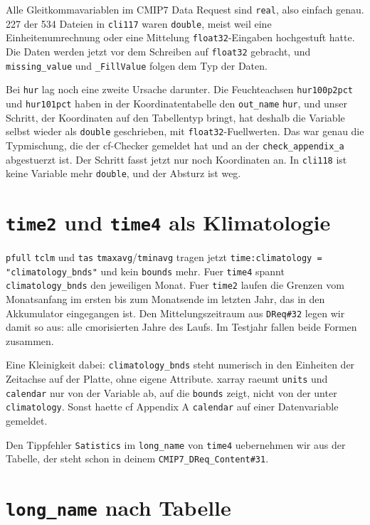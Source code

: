 \documentclass[11pt,a4paper]{article}
\newcommand{\code}[1]{\texttt{\small #1}}
\begin{document}
Alle Gleitkommavariablen im CMIP7 Data Request sind \code{real}, also einfach
genau. 227 der 534 Dateien in \code{cli117} waren \code{double}, meist weil eine
Einheitenumrechnung oder eine Mittelung \code{float32}-Eingaben hochgestuft hatte.
Die Daten werden jetzt vor dem Schreiben auf \code{float32} gebracht, und
\code{missing\_value} und \code{\_FillValue} folgen dem Typ der Daten.

Bei \code{hur} lag noch eine zweite Ursache darunter. Die Feuchteachsen
\code{hur100p2pct} und \code{hur101pct} haben in der Koordinatentabelle den
\code{out\_name} \code{hur}, und unser Schritt, der Koordinaten auf den Tabellentyp
bringt, hat deshalb die Variable selbst wieder als \code{double} geschrieben, mit
\code{float32}-Fuellwerten. Das war genau die Typmischung, die der cf-Checker
gemeldet hat und an der \code{check\_appendix\_a} abgestuerzt ist. Der Schritt
fasst jetzt nur noch Koordinaten an. In \code{cli118} ist keine Variable mehr
\code{double}, und der Absturz ist weg.

\section{\code{time2} und \code{time4} als Klimatologie}

\code{pfull} \code{tclm} und \code{tas} \code{tmaxavg}/\code{tminavg} tragen jetzt
\code{time:climatology = "climatology\_bnds"} und kein \code{bounds} mehr. Fuer
\code{time4} spannt \code{climatology\_bnds} den jeweiligen Monat. Fuer
\code{time2} laufen die Grenzen vom Monatsanfang im ersten bis zum Monatsende
im letzten Jahr, das in den Akkumulator eingegangen ist. Den Mittelungszeitraum
aus \code{DReq\#32} legen wir damit so aus: alle cmorisierten Jahre des Laufs.
Im Testjahr fallen beide Formen zusammen.

Eine Kleinigkeit dabei: \code{climatology\_bnds} steht numerisch in den Einheiten
der Zeitachse auf der Platte, ohne eigene Attribute. xarray raeumt
\code{units} und \code{calendar} nur von der Variable ab, auf die \code{bounds}
zeigt, nicht von der unter \code{climatology}. Sonst haette cf Appendix A
\code{calendar} auf einer Datenvariable gemeldet.

Den Tippfehler \code{Satistics} im \code{long\_name} von \code{time4} uebernehmen
wir aus der Tabelle, der steht schon in deinem \code{CMIP7\_DReq\_Content\#31}.

\section{\code{long\_name} nach Tabelle}
\end{document}
